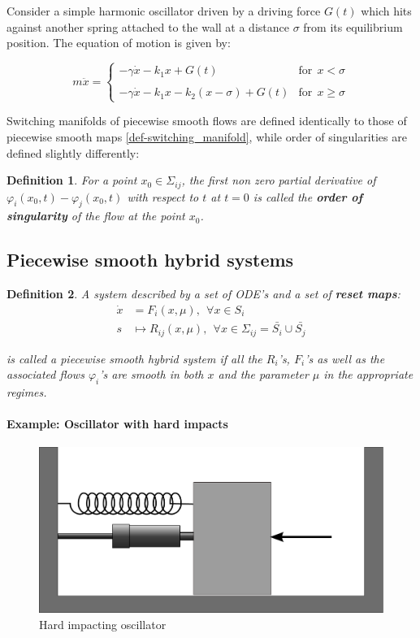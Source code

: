 \documentclass{book}
\renewcommand{\(}{\begin{columns}}
\renewcommand{\)}{\end{columns}}
\newcommand{\<}[1]{\begin{column}{#1}}
\renewcommand{\>}{\end{column}}
\newcommand{\bb}[1]{\textbf{#1}}
\newcommand{\para}{\paragraph}
\newtheorem{definition}{Definition}[section]
\begin{document}
Consider a simple harmonic oscillator driven by a driving force $G(t)$ which 
hits against another spring attached to the wall at a distance $\sigma$ from 
its equilibrium position. The equation of motion is given by:

\begin{equation}
\label{eq-soft_impact}
m\ddot{x}=
\begin{cases} 
-\gamma \dot{x}-k_1x+G(t)&\mathrm{for}~~x<\sigma
\\ \\ 
-\gamma \dot{x}-k_1x-k_2(x-\sigma)+G(t)&\mathrm{for}~~x\geq\sigma 
\end{cases}
\end{equation}

Switching manifolds of piecewise smooth flows are defined identically to those 
of piecewise smooth maps \eqref{def-switching_manifold}, while order of 
singularities are defined slightly differently:\\

\begin{definition}
For a point $x_0\in\Sigma_{ij}$, the first non zero partial derivative of 
$\varphi_i(x_0,t)-\varphi_j(x_0,t)$ with respect to $t$ at $t=0$ is called the \bb{order of 
singularity} of the 
flow at the point $x_0$.  
\end{definition}

\subsection{Piecewise smooth hybrid systems}
\begin{definition}
A system described by a set of ODE's and a set of \bb{reset maps}:
\begin{align}
\label{}
\label{def-hybrid}
\dot{x}&=F_i(x,\mu),~~\forall x\in S_i\\
s&\mapsto R_{ij}(x,\mu),~~\forall x\in\Sigma_{ij}=\bar{S_i}\cup\bar{S_j}
\end{align}

is called a piecewise smooth hybrid system if all the $R_i$'s, $F_i$'s as well 
as the associated flows $\varphi_i$'s are smooth in both $x$ and the parameter 
$\mu$ in the appropriate regimes.  
\end{definition}

\para{Example: Oscillator with hard impacts\\}
\begin{figure}[!hbp]
\caption{Hard impacting oscillator}
\begin{center}
\includegraphics[width=0.5\columnwidth]{hardcol}
\end{center}
\end{figure}
\end{document}

